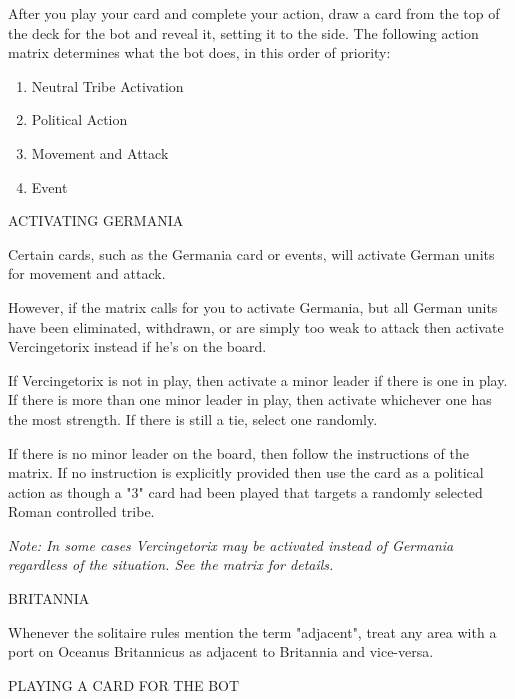 After you play your card and complete your action, draw a card from the top of the deck for the bot and reveal it, setting it to the side. The following action matrix determines what the bot does, in this order of priority:

\begin{enumerate}
  \item Neutral Tribe Activation
  \item Political Action
  \item Movement and Attack
  \item Event
\end{enumerate}

ACTIVATING GERMANIA

Certain cards, such as the Germania card or events, will activate German units for movement and attack.

However, if the matrix calls for you to activate Germania, but all German units have been eliminated, withdrawn, or are simply too weak to attack then activate Vercingetorix instead if he's on the board.

If Vercingetorix is not in play, then activate a minor leader if there is one in play. If there is more than one minor leader in play, then activate whichever one has the most strength. If there is still a tie, select one randomly.

If there is no minor leader on the board, then follow the instructions of the matrix. If no instruction is explicitly provided then use the card as a political action as though a "3" card had been played that targets a randomly selected Roman controlled tribe.

\textit{Note: In some cases Vercingetorix may be activated instead of Germania regardless of the situation. See the matrix for details.}

BRITANNIA

Whenever the solitaire rules mention the term "adjacent", treat any area with a port on Oceanus Britannicus as adjacent to Britannia and vice-versa.

\label{solitaire:playing_a_card_for_the_bot}PLAYING A CARD FOR THE BOT

